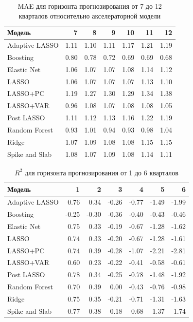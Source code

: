 \begin{table}[ht]
\centering
\caption{MAE для горизонта прогнозирования от 7 до 12 кварталов относительно акселераторной модели}
\begin{tabular}{lrrrrrr}
  \hline
Модель & 7 & 8 & 9 & 10 & 11 & 12 \\ 
  \hline
Adaptive LASSO & 1.11 & 1.10 & 1.11 & 1.17 & 1.21 & 1.19 \\ 
  Boosting & 0.80 & 0.78 & 0.72 & 0.69 & 0.69 & 0.68 \\ 
  Elastic Net & 1.06 & 1.07 & 1.07 & 1.08 & 1.14 & 1.12 \\ 
  LASSO & 1.06 & 1.07 & 1.07 & 1.07 & 1.13 & 1.10 \\ 
  LASSO+PC & 1.19 & 1.27 & 1.30 & 1.29 & 1.34 & 1.38 \\ 
  LASSO+VAR & 0.96 & 1.08 & 1.07 & 1.08 & 1.08 & 1.05 \\ 
  Post LASSO & 1.11 & 1.12 & 1.13 & 1.16 & 1.22 & 1.19 \\ 
  Random Forest & 0.93 & 1.01 & 0.94 & 0.93 & 0.98 & 1.04 \\ 
  Ridge & 1.07 & 1.09 & 1.08 & 1.08 & 1.15 & 1.15 \\ 
  Spike and Slab & 1.08 & 1.07 & 1.09 & 1.08 & 1.14 & 1.11 \\ 
   \hline
\end{tabular}
\end{table}

\newpage

\begin{table}[ht]
\centering
\caption{$R^2$ для горизонта прогнозирования от 1 до 6 кварталов}
\begin{tabular}{lrrrrrr}
  \hline
Модель & 1 & 2 & 3 & 4 & 5 & 6 \\ 
  \hline
Adaptive LASSO & 0.76 & 0.34 & -0.26 & -0.77 & -1.49 & -1.99 \\ 
  Boosting & -0.25 & -0.30 & -0.36 & -0.40 & -0.43 & -0.46 \\ 
  Elastic Net & 0.75 & 0.33 & -0.19 & -0.67 & -1.28 & -1.62 \\ 
  LASSO & 0.74 & 0.33 & -0.20 & -0.67 & -1.28 & -1.61 \\ 
  LASSO+PC & 0.74 & 0.39 & -0.28 & -1.07 & -2.21 & -2.81 \\ 
  LASSO+VAR & 0.60 & 0.23 & -0.22 & -0.41 & -0.58 & -0.61 \\ 
  Post LASSO & 0.78 & 0.34 & -0.25 & -0.78 & -1.48 & -1.92 \\ 
  Random Forest & 0.70 & 0.39 & 0.00 & -0.43 & -0.76 & -0.98 \\ 
  Ridge & 0.75 & 0.35 & -0.21 & -0.71 & -1.31 & -1.63 \\ 
  Spike and Slab & 0.77 & 0.38 & -0.18 & -0.68 & -1.37 & -1.74 \\ 
   \hline
\end{tabular}
\end{table}

